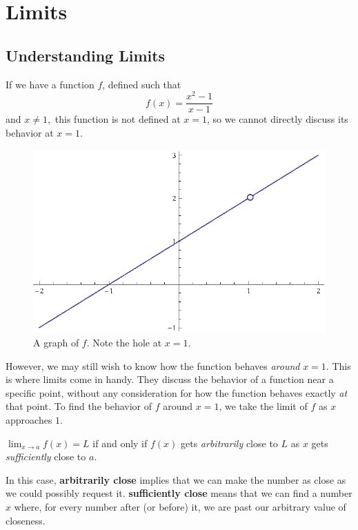 \chapter{Limits}\label{limits} 
\section{Understanding Limits}
If we have a function \(f\), defined such that
\[f(x)=\frac{x^2-1}{x-1} \]
and \(x \neq 1, \)
this function is not defined at \(x=1\), so we cannot directly discuss its behavior at \(x=1\).
\begin{figure}[h]
  \begin{center}
    \includegraphics[scale=0.7]{graphs/p1ch3x2m1xm1}
  \end{center}
  \caption{A graph of \(f\). Note the hole at \(x=1\).}
\end{figure}
However, we may still wish to know how the function behaves \emph{around} \(x=1\).
This is where limits come in handy.
They discuss the behavior of a function near a specific point, without any consideration for how the function behaves exactly \emph{at} that point.
To find the behavior of \(f\) around \(x=1\), we take the limit of \(f\) as \(x\) approaches \(1\).
\begin{defn}\label{defn:limi}
  \( \lim_{x \to a} f(x) = L \) if and only if \(f(x)\) gets \emph{arbitrarily} close to \( L \) as \(x\) gets \emph{sufficiently} close to \(a\).
\end{defn}
\begin{remark}
  In this case, \textbf{arbitrarily close} implies that we can make the number as close as we could possibly request it. \textbf{sufficiently close} means that we can find a number $x$ where, for every number after (or before) it, we are past our arbitrary value of closeness.
\end{remark}
